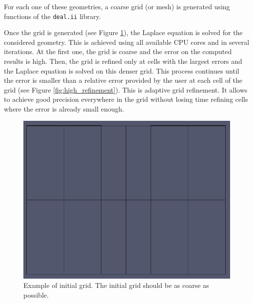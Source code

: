 \documentclass[11pt]{article}
\begin{document}
	For each one of these geometries, a coarse grid (or mesh) is generated using
	functions of the \texttt{deal.ii} library.

	Once the grid is generated (see Figure \ref{fig:no_refinement}), the Laplace equation is solved for the considered
	geometry. This is achieved using all available CPU cores and in several iterations.
	At the first one, the
	grid is coarse and the error on the computed results is high. Then, the grid is
	refined only at cells with the largest errors and the Laplace equation is
	solved on this denser grid. This process continues until
	the error is smaller than a relative error provided by the user at each cell of
	the grid (see Figure \ref{fig:high_refinement}). This is adaptive grid refinement. It allows to achieve good precision
	everywhere in the grid without losing time refining cells where the error is already small
	enough.

	\begin{figure}[H]
	  \center
	  \includegraphics[scale=0.4]{images/grid_refinement/no_refinement.png}
		\caption{Example of initial grid. The initial grid should be as coarse as
		possible.}
	  \label{fig:no_refinement}
	\end{figure}
\end{document}
